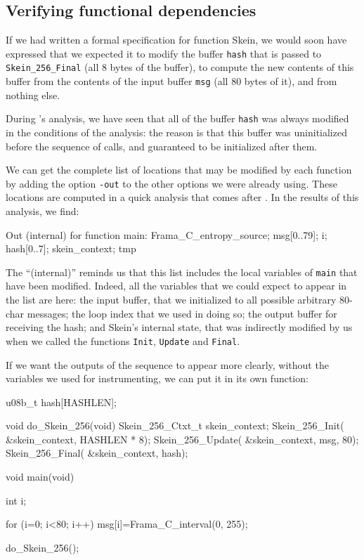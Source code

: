 \documentclass{frama-c-book}
\begin{document}
\subsection{Verifying functional dependencies}

If we had written a formal specification for function Skein, we would soon
have expressed that we expected it to modify the buffer \lstinline|hash|
that is passed to \lstinline|Skein_256_Final| (all 8 bytes of the buffer),
to compute the new contents of this buffer from the contents of the
input buffer \lstinline|msg| (all 80 bytes of it), and from nothing else.

During \Eva{}'s analysis, we have seen that all of the buffer \verb|hash|
was always modified in the conditions of the analysis: the reason is that
this buffer was uninitialized before the sequence of calls,
and guaranteed to be initialized after them.

We can get the complete list of locations that may be modified by each
function by adding the option \verb|-out| to the other options we were
already using. These locations are computed in a quick analysis that comes
after \Eva{}. In the results of this analysis, we find:
\begin{logs}
[inout] Out (internal) for function main:
          Frama_C_entropy_source; msg[0..79]; i; hash[0..7]; skein_context; tmp
\end{logs}
The ``(internal)'' reminds us that this list includes the local variables
of \lstinline|main| that have been modified. Indeed, all the variables
that we could expect to appear in the list are here: the input buffer, that
we initialized to all possible arbitrary 80-char messages; the loop index
that we used in doing so; the output buffer for receiving the hash;
and Skein's internal state, that was indirectly modified by us when we called
the functions \lstinline|Init|, \lstinline|Update| and \lstinline|Final|.

If we want the outputs of the sequence to appear more clearly, without the
variables we used for instrumenting, we can put it in its own function:

\begin{listing}{1}
u08b_t hash[HASHLEN];

void do_Skein_256(void)
{
  Skein_256_Ctxt_t skein_context;
  Skein_256_Init( &skein_context, HASHLEN * 8);
  Skein_256_Update( &skein_context, msg, 80);
  Skein_256_Final( &skein_context, hash);
}

void main(void)
{
  int i;

  for (i=0; i<80; i++) msg[i]=Frama_C_interval(0, 255);

  do_Skein_256();
}
\end{listing}
\end{document}
